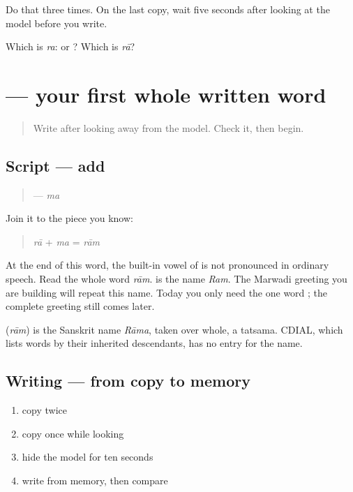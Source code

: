 Do that three times. On the last copy, wait five seconds after looking at the model before you write.

\begin{tcolorbox}[breakable,colback=teal!4,colframe=teal!35!black,title={Before you move on}]
Which is \emph{ra}: \textbf{} or \textbf{}? Which is \emph{rā}?
\end{tcolorbox}
\section[\texorpdfstring{\mw{राम} (rām)}{राम (rām)}]{ — your first whole written word}

\label{lesson:MW-W01-raam}



\begin{quote}
Write \textbf{} after looking away from the model. Check it, then begin.
\end{quote}

\subsection*{Script — add }
\begin{quote}
\textbf{} — \emph{ma}
\end{quote}

Join it to the piece you know:

\begin{quote}
\textbf{} \emph{rā} + \textbf{} \emph{ma} = \textbf{} \emph{rām}
\end{quote}

At the end of this word, the built-in vowel of \textbf{} is not pronounced in ordinary speech. Read the whole word \emph{rām}. \textbf{} is the name \emph{Ram}. The Marwadi greeting you are building will repeat this name. Today you only need the one word \textbf{}; the complete greeting still comes later.

\begin{cousinweb}
\textbf{} (\emph{rām}) is the Sanskrit name \emph{Rāma}, taken over whole, a tatsama. CDIAL, which lists words by their inherited descendants, has no entry for the name.
\end{cousinweb}

\subsection*{Writing — from copy to memory}
\begin{enumerate}
\raggedright
  \item copy \textbf{} twice
  \item copy \textbf{} once while looking
  \item hide the model for ten seconds
  \item write \textbf{} from memory, then compare
\end{enumerate}

